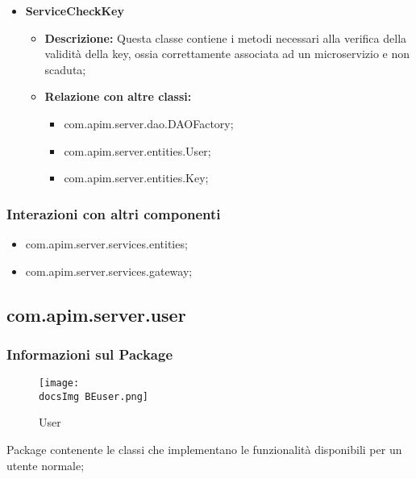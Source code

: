 {{{\begin{itemize}
\begin{itemize}
\begin{itemize}
            \item com.apim.server.entities.API;
            \item com.apim.server.entities.Key;
            \end{itemize}
          \end{itemize}
          \item \textbf{ServiceCheckKey}
            \begin{itemize}
              \item \textbf{Descrizione:} Questa classe contiene i metodi necessari alla verifica della validità della key, ossia correttamente associata ad un microservizio e non scaduta;
              \item \textbf{Relazione con altre classi:}
              \begin{itemize}
              \item com.apim.server.dao.DAOFactory;
              \item com.apim.server.entities.User;
              \item com.apim.server.entities.Key;
              \end{itemize}
            \end{itemize}
          \end{itemize}
          \subsubsection{Interazioni con altri componenti}
          \begin{itemize}
          \item com.apim.server.services.entities;
          \item com.apim.server.services.gateway;
          \end{itemize}
  }
    \subsection{com.apim.server.user}{
    \subsubsection{Informazioni sul Package}
        \begin{figure}[H] 									
          \centering
          \texttt{[image: \\docsImg BEuser.png]}
          \caption{User}
          \label{User}
        \end{figure}
        Package  contenente le classi che implementano le funzionalità disponibili per un utente normale;
}}}

